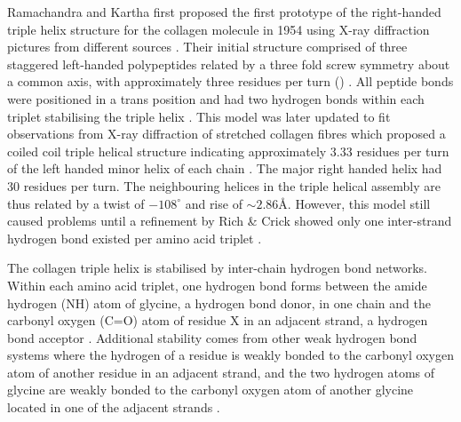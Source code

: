 Ramachandra and Kartha first proposed the first prototype of the right-handed triple helix structure for the collagen molecule in 1954 using X-ray diffraction pictures from different sources \cite{Ramachandran1954}. Their initial structure comprised of three staggered left-handed polypeptides related by a three fold screw symmetry about a common axis, with approximately three residues per turn () \cite{Ramachandran1954,Bhattacharjee2005}. All peptide bonds were positioned in a trans position and had two hydrogen bonds within each triplet stabilising the triple helix \cite{Ramachandran1954}. This model was later updated to fit observations from X-ray diffraction of stretched collagen fibres which proposed a coiled coil triple helical structure indicating approximately 3.33 residues per turn of the left handed minor helix of each chain  \cite{Ramachandran1955}. The major right handed helix had 30 residues per turn. The neighbouring helices in the triple helical assembly are thus related by a twist of $-108^{\circ}$ and rise of $\sim 2.86$\AA \cite{Ramachandran1955,Bhattacharjee2005}. However, this model still caused problems until a refinement by Rich \& Crick showed only one inter-strand hydrogen bond existed per amino acid triplet  \cite{Rich1955}. 

The collagen triple helix is stabilised by inter-chain hydrogen bond networks. Within each amino acid triplet, one hydrogen bond forms between the amide hydrogen (NH) atom of glycine, a hydrogen bond donor, in one chain and the carbonyl oxygen (C=O) atom of residue X in an adjacent strand, a hydrogen bond acceptor \cite{Ramachandran1954,Rich1955} .  Additional stability comes from other weak hydrogen bond systems where the hydrogen of a residue is weakly bonded to the carbonyl oxygen atom of another residue in an adjacent strand, and the two hydrogen atoms of glycine are weakly bonded to the carbonyl oxygen atom of another glycine located in one of the adjacent strands \cite{Perczel2009}.

